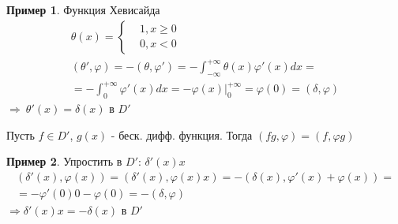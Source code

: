 \documentclass{article}
\theoremstyle{definition}
\numberwithin{theorem}{section}
\numberwithin{lemma}{section}
\numberwithin{definition}{section}
\numberwithin{corollary}{section}
\newtheorem*{eg}{Пример}
\numberwithin{equation}{section}
\let\phi\varphi
\let\implies\Rightarrow
\begin{document}
\begin{eg}
  Функция Хевисайда
  \begin{gather*}
    \theta(x)= \left\{\begin{aligned}
      & 1, x \ge 0 \\ 
      & 0, x < 0
    \end{aligned}\right. \\ 
    (\theta',\phi)=-(\theta,\phi')=-\int_{-\infty}^{+\infty}\theta(x)\phi'(x)dx = \\ 
    = -\int_{0}^{+\infty}\phi'(x)dx=-\phi(x)\big|_{0}^{+\infty}=\phi(0)=(\delta,\phi)
  \end{gather*}
  $\implies \ \theta'(x)=\delta(x)$ в $D'$
\end{eg}
\begin{definition}
  Пусть $f \in D'$, $g(x)$ - беск. дифф. функция. Тогда $(fg, \phi)=(f,\phi g)$
\end{definition}
\begin{eg}
  Упростить в $D'$: $\delta'(x)x$
  \begin{gather*}
    (\delta'(x),\phi(x))=(\delta'(x),\phi(x)x)=-(\delta(x),\phi'(x)+\phi(x))= \\ 
    =-\phi'(0)0-\phi(0)=-(\delta,\phi)
  \end{gather*}
  $\implies \delta'(x)x=-\delta(x)$ в $D'$
\end{eg}
\end{document}
